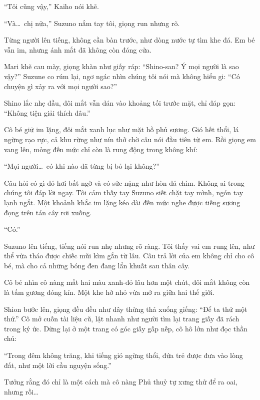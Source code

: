 \documentclass[../main.tex]{subfiles}
\begin{document}
``Tôi cũng vậy,'' Kaiho nói khẽ.

``Và\dots\ chị nữa,'' Suzuno nắm tay tôi, giọng run nhưng rõ.

Từng người lên tiếng, không cần bàn trước, như dòng nước tự tìm khe đá. Em bé vẫn im, nhưng ánh mắt đã không còn đóng cửa.

Mari khẽ cau mày, giọng khàn như giấy ráp: ``Shino-san? Ý mọi người là sao vậy?'' Suzune co rúm lại, ngơ ngác nhìn chúng tôi nói mà không hiểu gi: ``Có chuyện gì xảy ra với mọi người sao?''

Shino lắc nhẹ đầu, đôi mắt vẫn dán vào khoảng tối trước mặt, chỉ đáp gọn: ``Không tiện giải thích đâu.''

Cô bé giữ im lặng, đôi mắt xanh lục như mặt hồ phủ sương. Gió hết thổi, lá ngừng rạo rực, cả khu rừng như nín thở chờ câu nói đầu tiên từ em. Rồi giọng em vang lên, mỏng đến mức chỉ còn là rung động trong không khí:

``Mọi người\dots\ có khi nào đã từng bị bỏ lại không?''

Câu hỏi có gì đó hơi bất ngờ và có sức nặng như hòn đá chìm. Không ai trong chúng tôi đáp lời ngay. Tôi cảm thấy tay Suzuno siết chặt tay mình, ngón tay lạnh ngắt. Một khoảnh khắc im lặng kéo dài đến mức nghe được tiếng sương đọng trên tán cây rơi xuống.

``Có.''

Suzuno lên tiếng, tiếng nói run nhẹ nhưng rõ ràng. Tôi thấy vai em rung lên, như thể vừa tháo được chiếc mũi kìm gắn từ lâu. Câu trả lời của em không chỉ cho cô bé, mà cho cả những bóng đen đang lẩn khuất sau thân cây.

Cô bé nhìn cô nàng mắt hai màu xanh-đỏ lâu hơn một chút, đôi mắt không còn là tấm gương đóng kín. Một khe hở nhỏ vừa mở ra giữa hai thế giới.

Shion bước lên, giọng đều đều như dây thừng thả xuống giếng: ``Để ta thử một thứ.'' Cô mở cuốn tài liệu cũ, lật nhanh như người tìm lại trang giấy đã rách trong ký ức. Dừng lại ở một trang có góc giấy gấp nếp, cô hô lớn như đọc thần chú:

\begin{center}
  ``Trong đêm không trăng, khi tiếng gió ngừng thổi,
  đứa trẻ được đưa vào lòng đất,
  như một lời cầu nguyện sống.''
\end{center}

Tưởng rằng đó chỉ là một cách mà cô nàng Phủ thuỷ tự xưng thử để ra oai, nhưng rồi\dots
\end{document}
